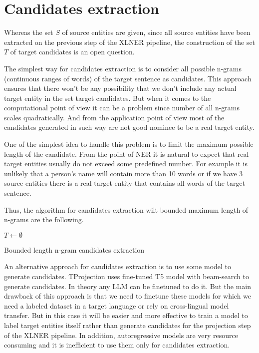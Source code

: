 \section{Candidates extraction}
Whereas the set \( S \) of source entities are given, since all source entities have been
extracted on the previous step of the XLNER pipeline, the construction of the set \( T \)
of target candidates is an open question.

The simplest way for candidates extraction is to consider all possible n-grams
(continuous ranges of words) of the target sentence as candidates. This approach ensures
that there won't be any possibility that we don't include any actual target entity in the set
target candidates. But when it comes to the computational point of view it can be a problem since
number of all n-grams scales quadratically. And from the application point of view most of
the candidates generated in such way are not good nominee to be a real target entity.

One of the simplest idea to handle this problem is to limit the maximum possible length of the candidate.
From the point of NER it is natural to expect that real target entities usually do not exceed some
predefined number. For example it is unlikely that a person's name will contain more than 10 words or
if we have 3 source entities there is a real target entity that contains all words of the target sentence.

Thus, the algorithm for candidates extraction wilt bounded maximum length of n-grams are the following.
\begin{algorithm}

    \( T \gets \emptyset \) \;
    \caption{Bounded length n-gram candidates extraction}
    \label{alg:ngram_extraction}
\end{algorithm}

An alternative approach for candidates extraction is to use some model to generate candidates.
TProjection uses fine-tuned T5 model with beam-search to generate candidates. In theory any LLM can be finetuned
to do it. But the main drawback of this approach is that we need to finetune these models for which we need
a labeled dataset in a target language or rely on cross-lingual model transfer.
But in this case it will be easier and more effective to train a model to label
target entities itself rather than generate candidates for the projection step of the
XLNER pipeline. In addition, autoregressive models are very resource consuming and it is
inefficient to use them only for candidates extraction.

